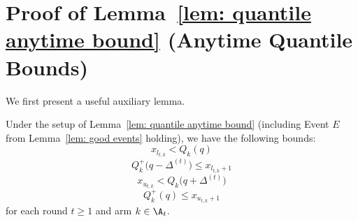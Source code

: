 \section{Proof of Lemma~\ref{lem: quantile anytime bound} (Anytime Quantile Bounds)}
\label{sec: appendix anytime quantile bounds}
We first present a useful auxiliary lemma.
\begin{lemma}
    Under the setup of Lemma~\ref{lem:  quantile anytime bound} (including Event $E$ from Lemma~\ref{lem: good events} holding), we have the following bounds:
    \begin{equation}
    \label{eq: xltk upper bound}
        x_{l_{t, k}} < Q_k(q)
    \end{equation}
    \begin{equation}
    \label{eq: xltk+1 lower bound}
        Q^+_k\big( q -  \Delta^{(t)} \big)
        \le x_{l_{t, k} + 1}
    \end{equation}
    \begin{equation}
    \label{eq: xutk upper bound}
        x_{u_{t, k}} < Q_k\big( q +  \Delta^{(t)} \big)
    \end{equation}
    \begin{equation}
    \label{eq: xutk+1 lower bound}
        Q^+_k(q)
        \le x_{u_{t, k} + 1}
    \end{equation}
    for each round $t \ge  1$ and arm $k \in \A_t$.
\end{lemma}
